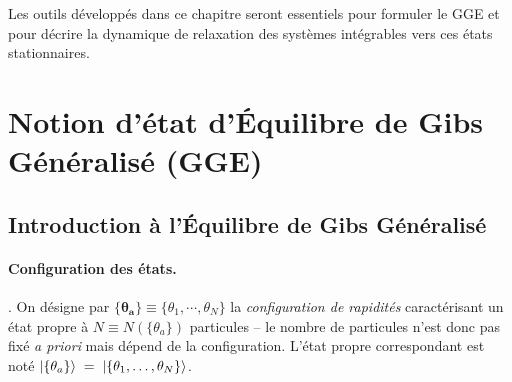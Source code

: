 \medskip

Les outils développés dans ce chapitre seront essentiels pour formuler le GGE et pour décrire la dynamique de relaxation des systèmes intégrables vers ces états stationnaires.





\section{Notion d’état d'Équilibre de Gibs Généralisé (GGE)}

\subsection{Introduction à l'Équilibre de Gibs Généralisé}


\paragraph{Configuration des états.}\label{sec:config-etats}.
On désigne par $\boldsymbol{\{ \theta_a \}}\equiv \{ \theta_1 , \cdots , \theta_{N} \}$ la \emph{configuration de rapidités} caractérisant un état propre à $N\!\equiv\!N(\{ \theta_a \})$ particules – le nombre de particules n’est donc pas fixé \emph{a priori} mais dépend de la configuration.  
L’état propre correspondant est noté $\ket{\{ \theta_a \}}\;=\;\ket{\{\theta_1,\dots,\theta_N \}}$.

